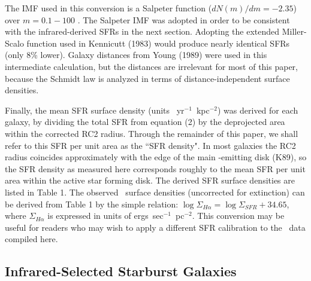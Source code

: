 The IMF used in this conversion is a Salpeter function  
($dN(m)/dm = -2.35$) over $m = 0.1 - 100$ \msun.  The Salpeter IMF was
adopted in order to be consistent with the infrared-derived SFRs in the
next section.  Adopting the extended Miller-Scalo function
used in Kennicutt (1983) would produce nearly identical SFRs (only 8\%
lower). Galaxy distances from Young \etal (1989) were used in this intermediate 
calculation, but the distances are irrelevant for most of this paper, 
because the Schmidt law is analyzed in terms of 
distance-independent surface densities.  

Finally, the mean SFR surface density (units \msun~yr$^{-1}$~kpc$^{-2}$) was 
derived for each galaxy, by dividing the total SFR from equation (2) by
the deprojected area within the corrected RC2 radius.
Through the remainder of this paper, we shall refer to this SFR per unit
area as the ``SFR density".   In most galaxies
the RC2 radius coincides approximately with the edge 
of the main \halpha-emitting disk (K89), so the SFR density as measured here
corresponds roughly to the mean SFR per unit area within 
the active star forming disk.  The derived SFR surface densities are listed
in Table 1.  The observed \halpha\ surface densities (uncorrected for
extinction) can be derived from Table 1 by the simple relation: 
$ \log \Sigma_{H\alpha} = \log \Sigma_{SFR} + 34.65$, where 
$\Sigma_{H\alpha}$ is expressed in units of ergs~sec$^{-1}$~pc$^{-2}$.
This conversion may be useful for readers who may wish to apply a
different SFR calibration to the \halpha\ data compiled here.



\subsection{Infrared-Selected Starburst Galaxies}

